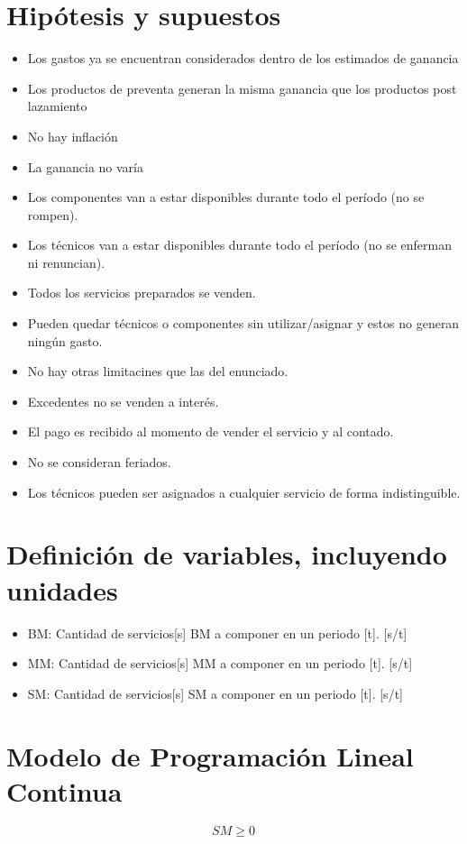 \documentclass{article}
\begin{document}
\part{Hip\'otesis y supuestos}
\begin{itemize}
	\item Los gastos ya se encuentran considerados dentro de los estimados de ganancia
	\item Los productos de preventa generan la misma ganancia que los productos post lazamiento
	\item No hay inflaci\'on 
	\item La ganancia no var\'ia
	\item Los componentes van a estar disponibles durante todo el per\'iodo (no se rompen).
	\item Los t\'ecnicos van a estar disponibles durante todo el per\'iodo (no se enferman ni renuncian).
	\item Todos los servicios preparados se venden.
	\item Pueden quedar t\'ecnicos o componentes sin utilizar/asignar y estos no generan ning\'un gasto.
	\item No hay otras limitacines que las del enunciado.
	\item Excedentes no se venden a inter\'es.
	\item El pago es recibido al momento de vender el servicio y al contado.
	\item No se consideran feriados.
	\item Los t\'ecnicos pueden ser asignados a cualquier servicio de forma indistinguible.
\end{itemize}


\part{Definici\'on de variables, incluyendo unidades}
\begin{itemize}
	\item BM: Cantidad de servicios[s] BM a componer en un periodo [t]. [s/t]
	\item MM: Cantidad de servicios[s] MM a componer en un periodo [t]. [s/t]
	\item SM: Cantidad de servicios[s] SM a componer en un periodo [t]. [s/t]
\end{itemize}

\part{Modelo de Programaci\'on Lineal Continua}
\begin{equation}
	SM \geq 0
\end{equation}
\end{document}
